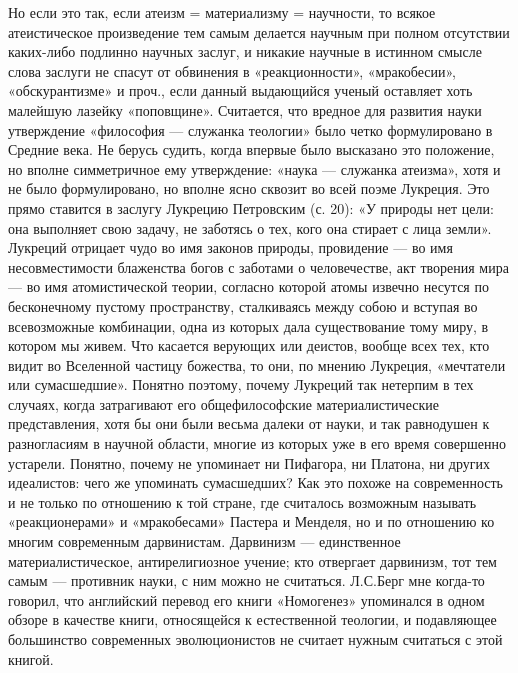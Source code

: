 Но  если  это  так,  если   атеизм  =  материализму  =  научности,  то
всякое  атеистическое  произведение  тем самым  делается  научным  при
полном  отсутствии  каких-либо  подлинно  научных  заслуг,  и  никакие
научные  в истинном  смысле слова  заслуги  не спасут  от обвинения  в
«реакционности»,  «мракобесии», «обскурантизме»  и проч.,  если данный
выдающийся  ученый   оставляет  хоть  малейшую   лазейку  «поповщине».
Считается, что  вредное для развития науки  утверждение «философия ---
служанка  теологии»  было  четко  формулировано  в  Средние  века.  Не
берусь судить, когда  впервые было высказано это  положение, но вполне
симметричное ему утверждение: «наука ---  служанка атеизма», хотя и не
было формулировано, но вполне ясно сквозит во всей поэме Лукреция. Это
прямо ставится в  заслугу Лукрецию Петровским (с. 20):  «У природы нет
цели: она выполняет свою задачу, не заботясь о тех, кого она стирает с
лица земли». Лукреций отрицает чудо во имя законов природы, провидение
--- во имя несовместимости блаженства богов с заботами о человечестве,
акт  творения   мира  ---  во  имя   атомистической  теории,  согласно
которой атомы  извечно несутся  по бесконечному  пустому пространству,
сталкиваясь между собою и вступая  во всевозможные комбинации, одна из
которых дала существование тому миру, в котором мы живем. Что касается
верующих или деистов, вообще всех  тех, кто видит во Вселенной частицу
божества,  то они,  по мнению  Лукреция, «мечтатели  или сумасшедшие».
Понятно поэтому,  почему Лукреций  так нетерпим  в тех  случаях, когда
затрагивают его общефилософские материалистические представления, хотя
бы они были весьма далеки от  науки, и так равнодушен к разногласиям в
научной  области,  многие  из  которых  уже  в  его  время  совершенно
устарели. Понятно,  почему не  упоминает ни  Пифагора, ни  Платона, ни
других идеалистов:  чего же упоминать  сумасшедших? Как это  похоже на
современность и  не только  по отношению к  той стране,  где считалось
возможным называть «реакционерами» и  «мракобесами» Пастера и Менделя,
но  и  по  отношению  ко  многим  современным  дарвинистам.  Дарвинизм
---  единственное  материалистическое,   антирелигиозное  учение;  кто
отвергает  дарвинизм,  тот  тем  самым  ---  противник  науки,  с  ним
можно  не считаться.  Л.С.Берг  мне когда-то  говорил, что  английский
перевод его  книги «Номогенез»  упоминался в  одном обзоре  в качестве
книги, относящейся к естественной  теологии, и подавляющее большинство
современных эволюционистов не считает нужным считаться с этой книгой.

